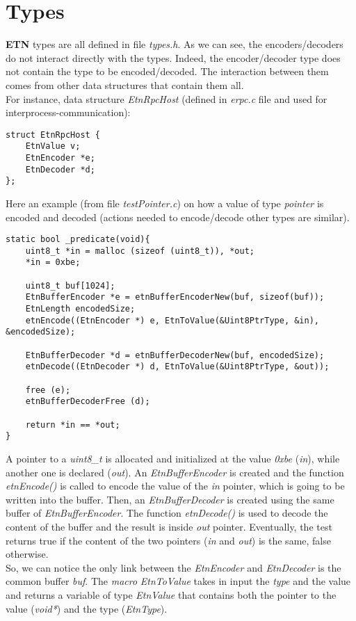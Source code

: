 

\section*{Types}
\textbf{ETN} types are all defined in file \emph{types.h}.
As we can see, the encoders/decoders do not interact directly with the types. Indeed, the encoder/decoder type does not contain the type to be encoded/decoded. The interaction between them comes from other data structures that contain them all.\\
For instance, data structure \emph{EtnRpcHost} (defined in \emph{erpc.c} file and used for interprocess-communication):
\begin{lstlisting}
struct EtnRpcHost {
	EtnValue v;
	EtnEncoder *e;
	EtnDecoder *d;
};
\end{lstlisting}
Here an example (from file \emph{testPointer.c}) on how a value of type \emph{pointer} is encoded and decoded (actions needed to encode/decode other types are similar).


\begin{lstlisting}
static bool _predicate(void){
	uint8_t *in = malloc (sizeof (uint8_t)), *out;
	*in = 0xbe;

	uint8_t buf[1024];
	EtnBufferEncoder *e = etnBufferEncoderNew(buf, sizeof(buf));
	EtnLength encodedSize;
	etnEncode((EtnEncoder *) e, EtnToValue(&Uint8PtrType, &in), &encodedSize);

	EtnBufferDecoder *d = etnBufferDecoderNew(buf, encodedSize);
	etnDecode((EtnDecoder *) d, EtnToValue(&Uint8PtrType, &out));

	free (e);
	etnBufferDecoderFree (d);

	return *in == *out;
}
\end{lstlisting}
A pointer to a \emph{uint8\_t} is allocated and initialized at the value \emph{0xbe} (\emph{in}), while another one is declared (\emph{out}). An \emph{EtnBufferEncoder} is created and the function \emph{etnEncode()} is called to encode the value of the \emph{in} pointer, which is going to be written into the buffer. Then, an \emph{EtnBufferDecoder} is created using the same buffer of \emph{EtnBufferEncoder}. The function \emph{etnDecode()} is used to decode the content of the buffer and the result is inside \emph{out} pointer. Eventually, the test returns true if the content of the two pointers (\emph{in} and \emph{out}) is the same, false otherwise.\\
So, we can notice the only link between the \emph{EtnEncoder} and \emph{EtnDecoder} is the common buffer \emph{buf}. The \emph{macro} \emph{EtnToValue} takes in input the \emph{type} and the value and returns a variable of type \emph{EtnValue} that contains both the pointer to the value (\emph{void*}) and the type (\emph{EtnType}).